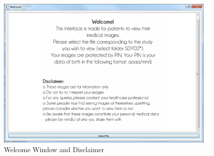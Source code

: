\begin{figure}[ht]
\centering
\includegraphics[width = 0.95\hsize]{./figures/screenshot/WelcomePage}
\caption{Welcome Window and Disclaimer}
\end{figure}